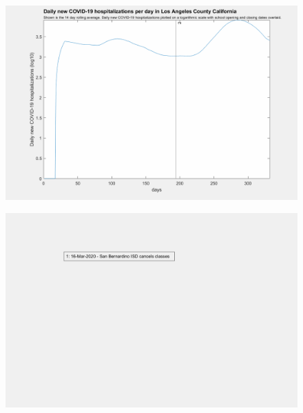 \documentclass[]{article}
\begin{document}
\begin{figure}[!h]
	\includegraphics[width=\linewidth]{images/los_angeles_hospitalizations_school_log.png}
	\caption{}
	\label{fig:images/los_angeles_hospitalizations_school_logLabel}
\end{figure}

\begin{figure}[!h]
	\includegraphics[width=\linewidth]{legends/san_bernardino_school_legend.png}
	\caption{}
	\label{fig:legends/san_bernardino_school_legendLabel}
\end{figure}
\end{document}
